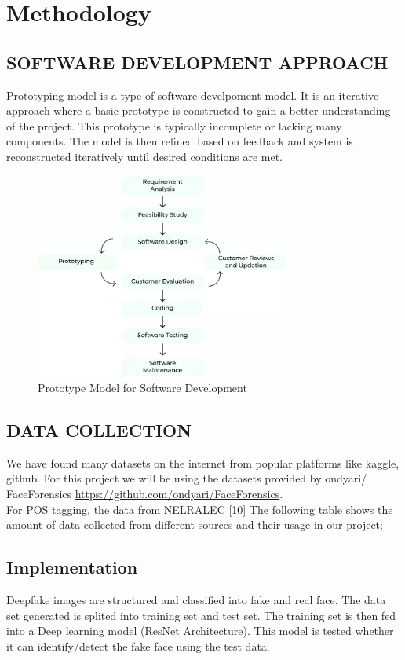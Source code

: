     \chapter{Methodology}
       \section{SOFTWARE DEVELOPMENT APPROACH}
        Prototyping model is a type of software develpoment model. It is an iterative approach where a basic prototype is constructed to gain a better understanding of the project. This prototype is typically incomplete or lacking many components. The model is then refined based on feedback and system is reconstructed iteratively until desired conditions are met.
         \begin{figure}[hbt!]
            \centering
                \includegraphics[width=0.75\textwidth]{./img/prototype model.png}
                \caption{Prototype Model for Software Development}
        \end{figure}
        \section{DATA COLLECTION}
        We have found many datasets on the internet from popular platforms like kaggle, github. For this project we will be using the datasets provided by ondyari/ FaceForensics \url{https://github.com/ondyari/FaceForensics}.\\
            For POS tagging, the data from NELRALEC [10] The following table shows the amount
            of data collected from different sources and their usage in our project;

    
        \section{Implementation}
        Deepfake images are structured and classified into fake and real face. The data set generated is splited into training set and test set. The training set is then fed into a Deep learning model (ResNet Architecture). This model is tested whether it can identify/detect the fake face using the test data.

